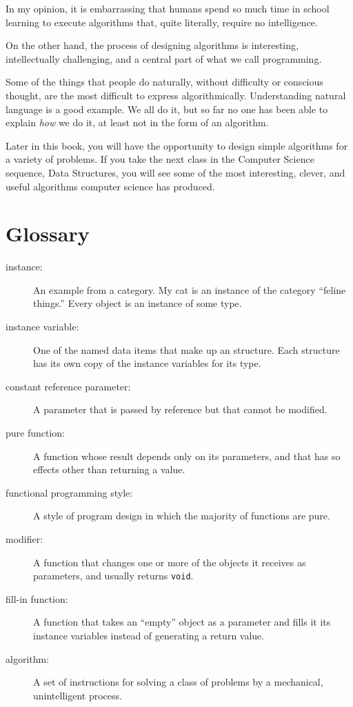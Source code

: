 In my opinion, it is embarrassing that humans spend so much time in
school learning to execute algorithms that, quite literally, require
no intelligence.

On the other hand, the process of designing algorithms is interesting,
intellectually challenging, and a central part of what we call
programming.

Some of the things that people do naturally, without difficulty
or conscious thought, are the most difficult to express
algorithmically.  Understanding natural language is a good
example.  We all do it, but so far no one has been able to
explain {\em how} we do it, at least not in the form of an
algorithm.

Later in this book, you will have the opportunity to design
simple algorithms for a variety of problems.  If you take
the next class in the Computer Science sequence, Data Structures,
you will see some of the most interesting, clever, and
useful algorithms computer science has produced.

\section{Glossary}

\begin{description}

\item[instance:]  An example from a category.  My cat is an
instance of the category ``feline things.''  Every object is
an instance of some type.

\item[instance variable:]  One of the named data items that make
up an structure.  Each structure has its own copy of
the instance variables for its type.

\item[constant reference parameter:]  A parameter that is passed
by reference but that cannot be modified.

\item[pure function:]  A function whose result depends only on its
parameters, and that has so effects other than returning
a value.

\item[functional programming style:]  A style of program design
in which the majority of functions are pure.

\item[modifier:]  A function that changes one or more of the objects
it receives as parameters, and usually returns {\tt void}.

\item[fill-in function:]  A function that takes an ``empty''
object as a parameter and fills it its instance variables instead
of generating a return value.

\item[algorithm:]  A set of instructions for solving a class of
problems by a mechanical, unintelligent process.


\end{description}

